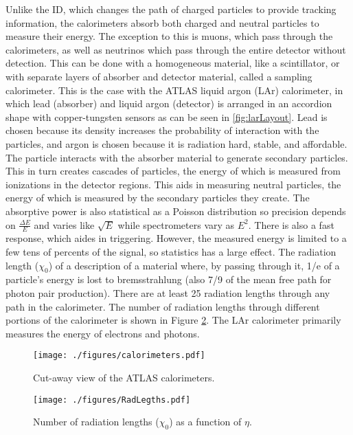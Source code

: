 Unlike the ID, which changes the path of charged particles to provide tracking information, the calorimeters absorb both charged and neutral particles to measure their energy.  The exception to this is muons, which pass through the calorimeters, as well as neutrinos which pass through the entire detector without detection.  This can be done with a homogeneous material, like a scintillator, or with separate layers of absorber and detector material, called a sampling calorimeter.  This is the case with the ATLAS liquid argon (LAr) calorimeter, in which lead (absorber) and liquid argon (detector) is arranged in an accordion shape with copper-tungsten sensors as can be seen in \ref{fig:larLayout}.  Lead is chosen because its density increases the probability of interaction with the particles, and argon is chosen because it is radiation hard, stable, and affordable.  The particle interacts with the absorber material to generate secondary particles.  This in turn creates cascades of particles, the energy of which is measured from ionizations in the detector regions.  This aids in measuring neutral particles, the energy of which is measured by the secondary particles they create.  The absorptive power is also statistical as a Poisson distribution so precision depends on $\frac{\Delta E}{E}$ and varies like $\sqrt{E}$ while spectrometers vary as $E^{2}$.  There is also a fast response, which aides in triggering.  However, the measured energy is limited to a few tens of percents of the signal, so statistics has a large effect.  The radiation length ($\chi_{0}$) of a description of a material where, by passing through it, 1/e of a particle's energy is lost to bremsstrahlung (also 7/9 of the mean free path for photon pair production).  There are at least 25 radiation lengths through any path in the calorimeter.  The number of radiation lengths through different portions of the calorimeter is shown in Figure \ref{fig:radLengths}.  The LAr calorimeter primarily measures the energy of electrons and photons.\\

\begin{figure}[h!]
  \centering
	\texttt{[image: ./figures/calorimeters.pdf]}
\caption{\label{fig:calorimeters}{ Cut-away view of the ATLAS calorimeters\cite{DetectorPaper:2008}. }} %
\end{figure}

\begin{figure}[h!]
  \centering
	\texttt{[image: ./figures/RadLegths.pdf]}
\caption{\label{fig:radLengths}{ Number of radiation lengths ($\chi_{0}$) as a function of $\eta$. }} %
\end{figure}


